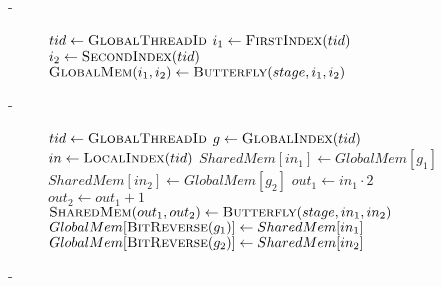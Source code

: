 \documentclass[varwidth]{standalone}
\begin{document}
%
\selectfont%
\color{turquoise-3}
-
\begin{figure}%
\begin{algorithmic}[1]%
%
	\State $tid \gets \Call{GlobalThreadId}{}$%
	\State $i_1 \gets \Call{FirstIndex}{tid}$%
	\State $i_2 \gets \Call{SecondIndex}{tid}$%
	\State $\Call{GlobalMem}{i_1,i_2} \gets \Call{Butterfly}{stage,i_1,i_2}$%
\EndProcedure%
\end{algorithmic}%
\end{figure}%
-%
\begin{figure}%
\begin{algorithmic}[1]%
%
	\State $tid \gets \Call{GlobalThreadId}{}$%
	\State $g \gets \Call{GlobalIndex}{tid}$%
	\State $in \gets \Call{LocalIndex}{tid}$%
	\State $SharedMem[in_1] \gets GlobalMem[g_1]$%
	\State $SharedMem[in_2] \gets GlobalMem[g_2]$%
	\State $out_1 \gets in_1 \cdot 2$%
	\State $out_2 \gets out_1+1$%
    	\State $\Call{SharedMem}{out_1,out_2} \gets \Call{Butterfly}{stage,in_1,in_2}$%
    \EndFor%
	\State $GlobalMem[\Call{BitReverse}{g_1}] \gets SharedMem[in_1]$%
	\State $GlobalMem[\Call{BitReverse}{g_2}] \gets SharedMem[in_2]$%
\EndProcedure%
\end{algorithmic}%
\end{figure}%
-%
\end{document}

